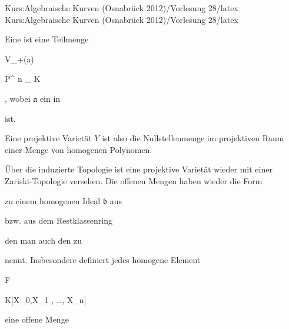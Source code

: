 Kurs:Algebraische Kurven (Osnabrück 2012)/Vorlesung 28/latex
Kurs:Algebraische Kurven (Osnabrück 2012)/Vorlesung 28/latex

\setcounter{section}{28}





{}

{


Eine  ist eine
Teilmenge


\mavergleichskettedisp

{\vergleichskette

{ V_+({\mathfrak a})
}

{ \subseteq} { {\mathbb P}^{ n }_{ K}
}

{ } {
}

{ } {
}

{ } {
}

}
{}{}{,}
wobei ${\mathfrak a}$ ein
in

 ist.


}


Eine projektive Varietät $Y$ ist also die Nullstellenmenge im projektiven Raum einer
 {} {}
Menge von homogenen Polynomen.


Über die induzierte Topologie ist eine projektive Varietät wieder mit einer Zariski-Topologie versehen. Die offenen Mengen haben wieder die Form

 zu einem homogenen Ideal ${\mathfrak b}$ aus

 bzw. aus dem Restklassenring

 den man auch den  {} zu

 nennt. Insbesondere definiert jedes homogene Element


\mavergleichskette

{\vergleichskette

{ F
}

{ \in }{ K[X_0,X_1 , \ldots , X_n]
}

{  }{
}

{    }{
}

{   }{
}

}
{}{}{}
eine offene Menge


